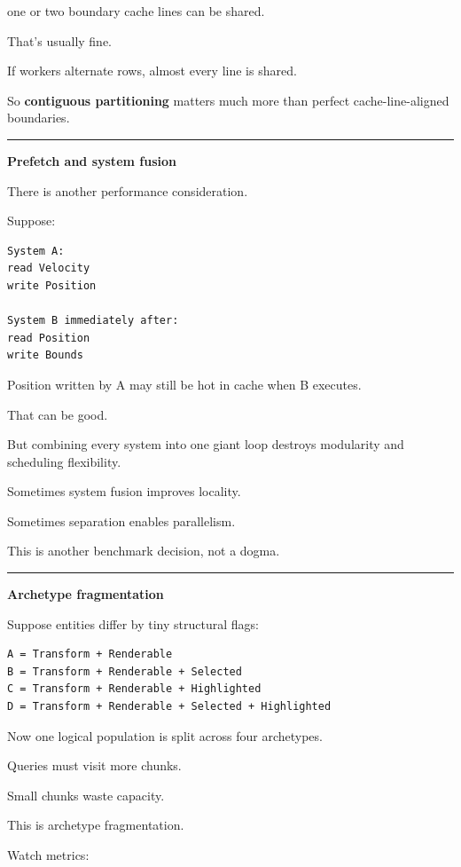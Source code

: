 one or two boundary cache lines can be shared.

That's usually fine.

If workers alternate rows, almost every line is shared.

So \textbf{contiguous partitioning} matters much more than perfect cache-line-aligned boundaries.

\begin{center}\rule{0.5\linewidth}{0.5pt}\end{center}

\textbf{Prefetch and system fusion}

There is another performance consideration.

Suppose:

\begin{verbatim}
System A:
read Velocity
write Position

System B immediately after:
read Position
write Bounds
\end{verbatim}

Position written by A may still be hot in cache when B executes.

That can be good.

But combining every system into one giant loop destroys modularity and scheduling flexibility.

Sometimes system fusion improves locality.

Sometimes separation enables parallelism.

This is another benchmark decision, not a dogma.

\begin{center}\rule{0.5\linewidth}{0.5pt}\end{center}

\textbf{Archetype fragmentation}

Suppose entities differ by tiny structural flags:

\begin{verbatim}
A = Transform + Renderable
B = Transform + Renderable + Selected
C = Transform + Renderable + Highlighted
D = Transform + Renderable + Selected + Highlighted
\end{verbatim}

Now one logical population is split across four archetypes.

Queries must visit more chunks.

Small chunks waste capacity.

This is archetype fragmentation.

Watch metrics:

